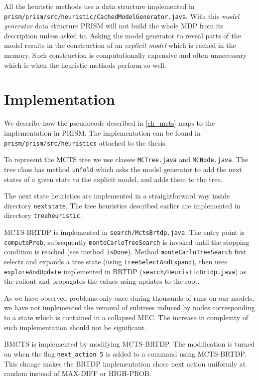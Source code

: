 All the heuristic methods use a data structure implemented in
\verb|prism/prism/src/heuristic/CachedModelGenerator.java|.
With this {\em model generator} data structure PRISM will not build the
whole MDP from its description unless asked to.
Asking the model generator to reveal parts of the model results in the
construction of an {\em explicit model} which is cached in the memory.
Such construction is computationally expensive and often unnecessary
which is when the heuristic methods perform so well.

\section{Implementation}

We describe how the pseudocode described in \autoref{ch_mcts} maps to
the implementation in PRISM. The implementation can be found in
\verb|prism/prism/src/heuristics| attached to the thesis.

To represent the MCTS tree we use classes \verb|MCTree.java| and
\linebreak
\verb|MCNode.java|. The tree class has method \verb|unfold|
which asks the model generator to add the next states of a given state
to the explicit model, and adds them to the tree.

The next state heuristics are implemented in a straightforward way
inside directory \verb|nextstate|. The tree heuristics described earlier
are implemented in directory \verb|treeheuristic|.

MCTS-BRTDP is implemented in \verb|search/MctsBrtdp.java|. The entry
point is \verb|computeProb|, subsequently
\verb|monteCarloTreeSearch| is invoked until the stopping condition
is reached (see method \verb|isDone|). Method
\verb|monteCarloTreeSearch| first selects and expands a tree state
(using \verb|treeSelectAndExpand|),
then uses \verb|exploreAndUpdate| implemented in BRTDP
(\verb|search/HeuristicBrtdp.java|) as the rollout and propagates
the values using updates to the root.

As we have observed problems only once during thousands of runs on our
models, we have not implemented the removal of subtrees induced by nodes
corresponding to a state which is contained in a collapsed MEC. The
increase in complexity of such implementation should not be significant.

BMCTS is implemented by modifying MCTS-BRTDP. The modification is turned
on when the flag \verb|next_action 5| is added to a command using
MCTS-BRTDP. This change makes the BRTDP implementation chose next action
uniformly at random instead of MAX-DIFF or HIGH-PROB.

